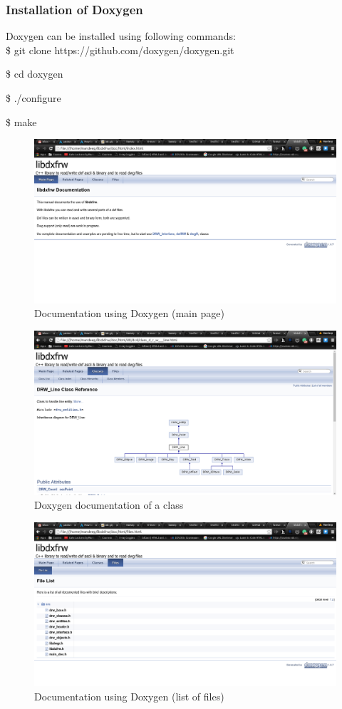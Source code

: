 \subsubsection{Installation of Doxygen}
Doxygen can be installed using following commands:\\

\hspace{4pt} \$ git clone https://github.com/doxygen/doxygen.git

\hspace{4pt} \$ cd doxygen

\hspace{4pt} \$ ./configure

\hspace{4pt} \$ make

\begin{figure}
\centering \includegraphics[scale=.3]{images/doc.png}
\caption{Documentation using Doxygen (main page)}
\end{figure}


\begin{figure}
\centering \includegraphics[scale=.3]{images/doc1.png}
\caption{Doxygen documentation of a class}
\end{figure}
\begin{figure}
\centering \includegraphics[scale=.3]{images/doc2.png}
\caption{Documentation using Doxygen (list of files)}
\end{figure}


